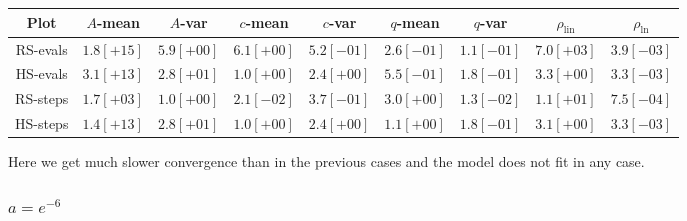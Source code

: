 \begin{table}[H]
    \centering
    \small
    \begin{tabular}{c||c|c|c|c|c|c|c|c}
Plot & \(A\)-mean & \(A\)-var & \(c\)-mean & \(c\)-var & \(q\)-mean & \(q\)-var & \(\rho_{\operatorname{lin}}\) & \(\rho_{\ln}\)\\\hline
\rowcolor{red}
RS-evals & \(1.8[+15]\) & \(5.9[+00]\) & \(6.1[+00]\) & \(5.2[-01]\) & \(2.6[-01]\) & \(1.1[-01]\) & \(7.0[+03]\) & \(3.9[-03]\) \\
\rowcolor{red}
HS-evals & \(3.1[+13]\) & \(2.8[+01]\) & \(1.0[+00]\) & \(2.4[+00]\) & \(5.5[-01]\) & \(1.8[-01]\) & \(3.3[+00]\) & \(3.3[-03]\) \\
\rowcolor{red}
RS-steps & \(1.7[+03]\) & \(1.0[+00]\) & \(2.1[-02]\) & \(3.7[-01]\) & \(3.0[+00]\) & \(1.3[-02]\) & \(1.1[+01]\) & \(7.5[-04]\) \\
\rowcolor{red}
HS-steps & \(1.4[+13]\) & \(2.8[+01]\) & \(1.0[+00]\) & \(2.4[+00]\) & \(1.1[+00]\) & \(1.8[-01]\) & \(3.1[+00]\) & \(3.3[-03]\) \\
    \end{tabular}
    \label{tab:my_label}
\end{table}

Here we get much slower convergence than in the previous cases and the model does not fit in any case.

\subsubsection{\(a = e^{-6}\)}

